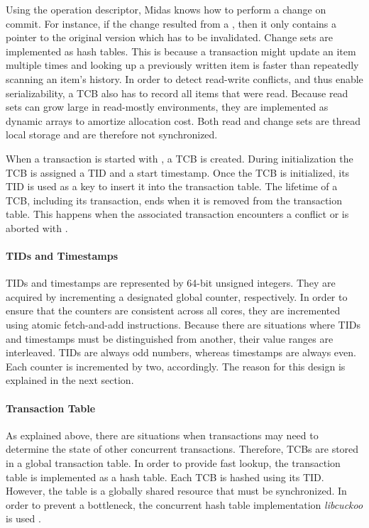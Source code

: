 Using the operation descriptor, Midas knows how to perform a change on commit. For instance, if the change resulted from a , then it only contains a pointer to the original version which has to be invalidated. Change sets are implemented as hash tables. This is because a transaction might update an item multiple times and looking up a previously written item is faster than repeatedly scanning an item's history. In order to detect read-write conflicts, and thus enable serializability, a TCB also has to record all items that were read. Because read sets can grow large in read-mostly environments, they are implemented as dynamic arrays to amortize allocation cost. Both read and change sets are thread local storage and are therefore not synchronized.

When a transaction is started with , a TCB is created. During initialization the TCB is assigned a TID and a start timestamp.  Once the TCB is initialized, its TID is used as a key to insert it into the transaction table. The lifetime of a TCB, including its transaction, ends when it is removed from the transaction table. This happens when the associated transaction encounters a conflict or is aborted with .

\paragraph{TIDs and Timestamps}

TIDs and timestamps are represented by 64-bit unsigned integers. They are acquired by incrementing a designated global counter, respectively. In order to ensure that the counters are consistent across all cores, they are incremented using atomic fetch-and-add instructions. Because there are situations where TIDs and timestamps must be distinguished from another, their value ranges are interleaved. TIDs are always odd numbers, whereas timestamps are always even. Each counter is incremented by two, accordingly. The reason for this design is explained in the next section.

\paragraph{Transaction Table}

As explained above, there are situations when transactions may need to determine the state of other concurrent transactions. Therefore, TCBs are stored in a global transaction table. In order to provide fast lookup, the transaction table is implemented as a hash table. Each TCB is hashed using its TID. However, the table is a globally shared resource that must be synchronized. In order to prevent a bottleneck, the concurrent hash table implementation \emph{libcuckoo} is used \cite{fan2013memc3, li2014algorithmic, libcuckoo2018home}.

